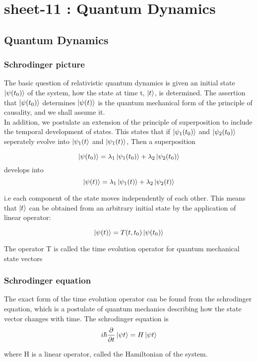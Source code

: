 \chapter{sheet-11 : Quantum Dynamics}

\section{Quantum Dynamics}

\subsection{Schrodinger picture}

The basic question of relativistic quantum dynamics is given an initial state $\ket{\psi(t_0)} $ of the system, how the state at time t, $\ket{t} $, is determined. The assertion that $ \ket{\psi(t_0)}$ determines $\ket{\psi(t)}$ is the quantum mechanical form of the principle of causality, and we shall assume it.\\
In addition, we postulate an extension of the principle of superposition to include the temporal development of states. This states that if $\ket{\psi_1(t_0)}$  and $\ket{\psi_2(t_0)}$ seperately evolve into $\ket{\psi_1(t}$ and $\ket{\psi_1(t)}$, Then a superposition

\[ \ket{\psi(t_0)} = \lambda_1 \ket{\psi_1(t_0)} + \lambda_2 \ket{\psi_2(t_0)}\] 
develops into 
\[ \ket{\psi(t)} = \lambda_1 \ket{\psi_1(t)} + \lambda_2 \ket{\psi_2(t)}\]

i.e each component of the state moves independently of each other. This means that $\ket{t}$ can be obtained from an arbitrary initial state by the application of linear operator:

\[\ket{\psi (t)}= T(t, t_0) \ket{\psi (t_0)}\] 

The operator T is called the time evolution operator for quantum mechanical state vectors

\subsection{Schrodinger equation}

The exact form of the time evolution operator can be found from the schrodinger equation, which is a postulate of quantum mechanics describing how the state vector changes with time. The schrodinger equation is 
\[i \hbar \frac{\partial}{\partial t} \ket{\psi t} = H \ket{\psi t} \]

where H is a linear operator, called the Hamiltonian of the system.
